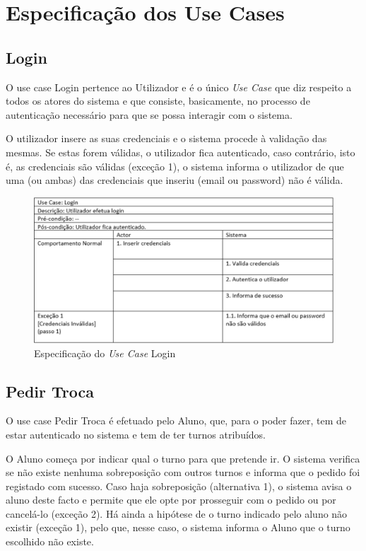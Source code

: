 \documentclass[12pt,a4paper]{report}
\begin{document}
\pagebreak
\section{Especificação dos Use Cases}
\subsection{Login}
O use case Login pertence ao Utilizador e é o único \emph{Use Case} que diz respeito a todos os atores do sistema e que consiste, basicamente, no processo de autenticação necessário para que se possa interagir com o sistema.

O utilizador insere as suas credenciais e o sistema procede à validação das mesmas. Se estas forem válidas, o utilizador fica autenticado, caso contrário, isto é, as credenciais são válidas
(exceção 1), o sistema informa o utilizador de que uma (ou ambas) das credenciais que inseriu (email ou password) não é válida.

\begin{figure}[H]
	\centering 
	\includegraphics[width=\textwidth]{modelacao/especificacao_use_case/Login.png}  
	\caption{Especificação do \emph{Use Case} Login}
\end{figure}
\pagebreak
\subsection{Pedir Troca}
O use case Pedir Troca é efetuado pelo Aluno, que, para o poder fazer, tem de estar autenticado no sistema e tem de ter turnos atribuídos.

O Aluno começa por indicar qual o turno para que pretende ir. O sistema verifica se não existe nenhuma sobreposição com outros turnos e informa que o pedido foi registado com sucesso. Caso haja sobreposição (alternativa 1), o sistema avisa o aluno deste facto e permite que ele opte por prosseguir com o pedido ou por cancelá-lo (exceção 2).
Há ainda a hipótese de o turno indicado pelo aluno não existir (exceção 1), pelo que, nesse caso, o sistema informa o Aluno que o turno escolhido não existe.
\end{document}
